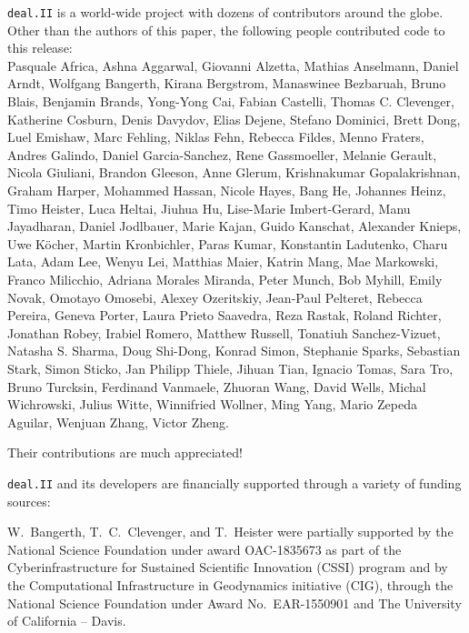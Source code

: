 \documentclass{ansarticle-preprint}
\newcommand{\specialword}[1]{\texttt{#1}}
\newcommand{\dealii}{{\specialword{deal.II}}\xspace}
\begin{document}
\dealii is a world-wide project with dozens of contributors around the
globe. Other than the authors of this paper, the following people
contributed code to this release:\\
%
%
Pasquale Africa,
Ashna Aggarwal,
Giovanni Alzetta,
Mathias Anselmann,
Daniel Arndt,
Wolfgang Bangerth,
Kirana Bergstrom,
Manaswinee Bezbaruah,
Bruno Blais,
Benjamin Brands,
Yong-Yong Cai,
Fabian Castelli,
Thomas C. Clevenger,
Katherine Cosburn,
Denis Davydov,
Elias Dejene,
Stefano Dominici,
Brett Dong,
Luel Emishaw,
Marc Fehling,
Niklas Fehn,
Rebecca Fildes,
Menno Fraters,
Andres Galindo,
Daniel Garcia-Sanchez,
Rene Gassmoeller,
Melanie Gerault,
Nicola Giuliani,
Brandon Gleeson,
Anne Glerum,
Krishnakumar Gopalakrishnan,
Graham Harper,
Mohammed Hassan,
Nicole Hayes,
Bang He,
Johannes Heinz,
Timo Heister,
Luca Heltai,
Jiuhua Hu,
Lise-Marie Imbert-Gerard,
Manu Jayadharan,
Daniel Jodlbauer,
Marie Kajan,
Guido Kanschat,
Alexander Knieps,
Uwe K{\"o}cher,
Martin Kronbichler,
Paras Kumar,
Konstantin Ladutenko,
Charu Lata,
Adam Lee,
Wenyu Lei,
Matthias Maier,
Katrin Mang,
Mae Markowski,
Franco Milicchio,
Adriana Morales Miranda,
Peter Munch,
Bob Myhill,
Emily Novak,
Omotayo Omosebi,
Alexey Ozeritskiy,
Jean-Paul Pelteret,
Rebecca Pereira,
Geneva Porter,
Laura Prieto Saavedra,
Reza Rastak,
Roland Richter,
Jonathan Robey,
Irabiel Romero,
Matthew Russell,
Tonatiuh Sanchez-Vizuet,
Natasha S. Sharma,
Doug Shi-Dong,
Konrad Simon,
Stephanie Sparks,
Sebastian Stark,
Simon Sticko,
Jan Philipp Thiele,
Jihuan Tian,
Ignacio Tomas,
Sara Tro,
Bruno Turcksin,
Ferdinand Vanmaele,
Zhuoran Wang,
David Wells,
Michal Wichrowski,
Julius Witte,
Winnifried Wollner,
Ming Yang,
Mario Zepeda Aguilar,
Wenjuan Zhang,
Victor Zheng.

Their contributions are much appreciated!


\bigskip

\dealii and its developers are financially supported through a
variety of funding sources:

W.~Bangerth, T.~C.~Clevenger, and T.~Heister were partially
supported by the National Science Foundation under award OAC-1835673
as part of the Cyberinfrastructure for Sustained Scientific Innovation (CSSI)
program  and by the Computational Infrastructure
in Geodynamics initiative (CIG), through the National Science
Foundation under Award No.~EAR-1550901 and The
University of California -- Davis.
\end{document}
